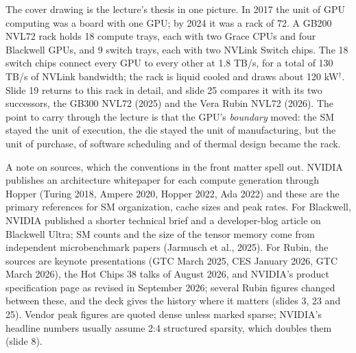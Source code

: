\documentclass[11pt,letterpaper]{article}
\begin{document}
The cover drawing is the lecture's thesis in one picture. In 2017 the unit of GPU computing was a board with one GPU; by 2024 it was a rack of 72. A GB200 NVL72 rack holds 18 compute trays, each with two Grace CPUs and four Blackwell GPUs, and 9 switch trays, each with two NVLink Switch chips. The 18 switch chips connect every GPU to every other at 1.8 TB/s, for a total of 130 TB/s of NVLink bandwidth; the rack is liquid cooled and draws about 120 kW$^\dagger$. Slide 19 returns to this rack in detail, and slide 25 compares it with its two successors, the GB300 NVL72 (2025) and the Vera Rubin NVL72 (2026). The point to carry through the lecture is that the GPU's \emph{boundary} moved: the SM stayed the unit of execution, the die stayed the unit of manufacturing, but the unit of purchase, of software scheduling and of thermal design became the rack.

A note on sources, which the conventions in the front matter spell out. NVIDIA publishes an architecture whitepaper for each compute generation through Hopper (Turing 2018, Ampere 2020, Hopper 2022, Ada 2022) and these are the primary references for SM organization, cache sizes and peak rates. For Blackwell, NVIDIA published a shorter technical brief and a developer-blog article on Blackwell Ultra; SM counts and the size of the tensor memory come from independent microbenchmark papers (Jarmusch et al., 2025). For Rubin, the sources are keynote presentations (GTC March 2025, CES January 2026, GTC March 2026), the Hot Chips 38 talks of August 2026, and NVIDIA's product specification page as revised in September 2026; several Rubin figures changed between these, and the deck gives the history where it matters (slides 3, 23 and 25). Vendor peak figures are quoted dense unless marked sparse; NVIDIA's headline numbers usually assume 2:4 structured sparsity, which doubles them (slide 8).
\end{document}
